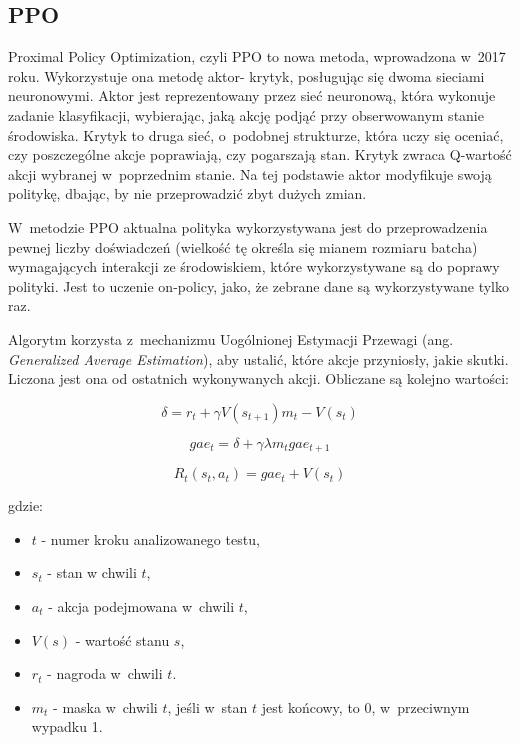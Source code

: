 \documentclass[a4paper,12pt]{article}
\begin{document}
\subsection{PPO}
Proximal Policy Optimization, czyli PPO to nowa metoda, wprowadzona w~2017 roku. Wykorzystuje ona metodę aktor- krytyk, posługując się dwoma sieciami neuronowymi. Aktor jest reprezentowany przez sieć neuronową, która wykonuje zadanie klasyfikacji, wybierając, jaką akcję podjąć przy obserwowanym stanie środowiska. Krytyk to druga sieć, o~podobnej strukturze, która uczy się oceniać, czy poszczególne akcje poprawiają, czy pogarszają stan. Krytyk zwraca Q-wartość akcji wybranej w~poprzednim stanie. Na tej podstawie aktor modyfikuje swoją politykę, dbając, by nie przeprowadzić zbyt dużych zmian.

W~metodzie PPO aktualna polityka wykorzystywana jest do przeprowadzenia pewnej liczby doświadczeń (wielkość tę określa się mianem rozmiaru batcha) wymagających interakcji ze środowiskiem, które wykorzystywane są do poprawy polityki. Jest to uczenie on-policy, jako, że zebrane dane są wykorzystywane tylko raz.

Algorytm korzysta z~mechanizmu Uogólnionej Estymacji Przewagi (ang. \textit{Generalized Average Estimation}), aby ustalić, które akcje przyniosły, jakie skutki. Liczona jest ona od ostatnich wykonywanych akcji. Obliczane są kolejno wartości:

\begin{equation}
	\delta = r_t + \gamma V(s_{t+1})m_t - V(s_t)
\end{equation}

\begin{equation}
	gae_t = \delta + \gamma \lambda m_t gae_{t+1}
\end{equation}

\begin{equation}
	R_t(s_t,a_t) = gae_t + V(s_t)
\end{equation}

gdzie:
\begin{itemize}
	\item $t$ - numer kroku analizowanego testu,
	\item $s_t$ - stan w chwili $t$,
	\item $a_t$ - akcja podejmowana w~chwili $t$,
	\item $V(s)$ - wartość stanu $s$,
	\item $r_t$ - nagroda w~chwili $t$.
	\item $m_t$ - maska w~chwili $t$, jeśli w~stan $t$ jest końcowy, to 0, w~przeciwnym wypadku 1.
\end{itemize}
\end{document}

